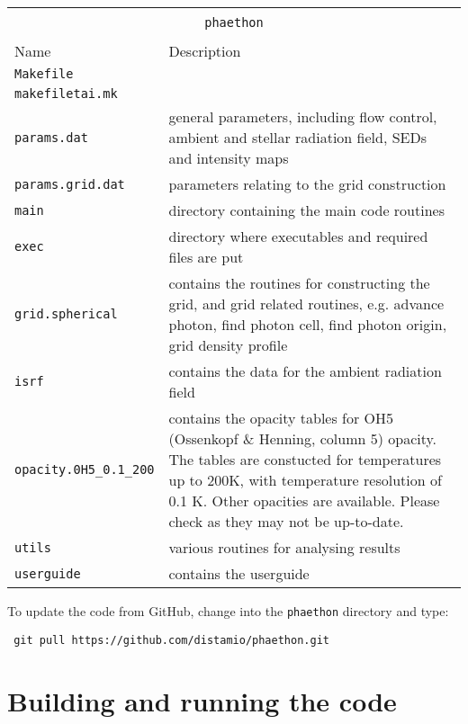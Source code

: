\documentclass[12pt,a4paper]{article}
\begin{document}
\vspace{1cm}
{\centering 
\begin{tabular}{|p{4cm}|p{13.1cm}|}
\hline
\multicolumn{2}{|c|}{}\\ 
\multicolumn{2}{|c|}{\large\texttt{phaethon}}\\
\multicolumn{2}{|c|}{}\\  
\hline
Name & Description \\
\hline
\texttt{Makefile} & \\
\texttt{makefiletai.mk}&  \\
\texttt{params.dat}& general parameters, including flow control, ambient and stellar radiation field, SEDs and intensity maps\\
\texttt{params.grid.dat}& parameters relating to the grid construction \\
\texttt{main}& directory containing the main code routines\\
\texttt{exec}& directory where executables and required files are put\\
\texttt{grid.spherical}& contains the routines for constructing the grid, and grid related routines, e.g. advance photon, find photon cell, find photon origin, grid density profile \\
\texttt{isrf}& contains the data for the ambient radiation field \\
\texttt{opacity.0H5\_0.1\_200}& contains the opacity tables for OH5 (Ossenkopf \& Henning, column 5) opacity. The tables are constucted for temperatures up to 200K, with temperature resolution of 0.1 K. Other opacities are available. Please check as they may not be up-to-date.\\
\texttt{utils}& various routines for analysing results\\
\texttt{userguide}& contains the userguide\\
\hline
\end{tabular}
\par}
\vspace{1cm}

To update the code from GitHub, change into the \texttt{phaethon} directory and type:
\vspace{0.5cm}

 \texttt{ git pull https://github.com/distamio/phaethon.git}
\vspace{0.5cm}

\section{Building and running the code}
\end{document}
